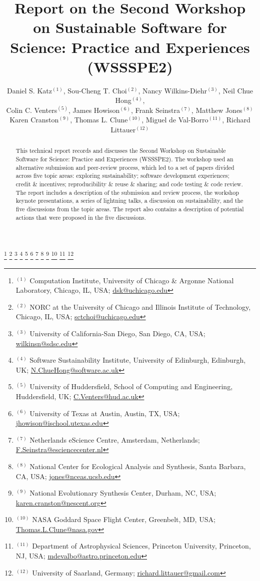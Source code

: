 \documentclass[11pt, oneside]{amsart}
\begin{document}
\title[]{Report on the Second Workshop on Sustainable Software for Science: Practice and Experiences (WSSSPE2)}

\author{Daniel S. Katz$^{(1)}$, Sou-Cheng T. Choi$^{(2)}$, Nancy Wilkins-Diehr$^{(3)}$, Neil Chue Hong$^{(4)}$,
\\Colin C. Venters$^{(5)}$, James Howison$^{(6)}$, Frank Seinstra$^{(7)}$, Matthew Jones$^{(8)}$
\\Karen Cranston$^{(9)}$, Thomas L. Clune$^{(10)}$, Miguel de Val-Borro$^{(11)}$, Richard Littauer$^{(12)}$}
%
\thanks{{}$^{(1)}$ Computation Institute, 
University of Chicago \& Argonne National Laboratory, Chicago, IL, USA; \url{dsk@uchicago.edu}}
%
\thanks{{}$^{(2)}$ NORC at the University of Chicago and Illinois Institute of Technology, Chicago, IL, USA; \url{sctchoi@uchicago.edu}}
%
\thanks{{}$^{(3)}$ University of California-San Diego, San Diego, CA, USA; \url{wilkinsn@sdsc.edu}}
%
\thanks{{}$^{(4)}$ Software Sustainability Institute, 
University of Edinburgh, Edinburgh, UK; \url{N.ChueHong@software.ac.uk}}
%
\thanks{{}$^{(5)}$ University of Huddersfield, School of Computing and Engineering, Huddersfield, UK; \url{C.Venters@hud.ac.uk}}
%
\thanks{{}$^{(6)}$ University of Texas at Austin, Austin, TX, USA; \url{jhowison@ischool.utexas.edu}}
%
\thanks{{}$^{(7)}$ Netherlands eScience Centre, Amsterdam, Netherlands; \url{F.Seinstra@esciencecenter.nl}}
%
\thanks{{}$^{(8)}$ National Center for Ecological Analysis and Synthesis, Santa Barbara, CA, USA; \url{jones@nceas.ucsb.edu}}
%
\thanks{{}$^{(9)}$ National Evolutionary Synthesis Center, Durham, NC, USA; \url{karen.cranston@nescent.org}}
%
\thanks{{}$^{(10)}$ NASA Goddard Space Flight Center, Greenbelt, MD, USA; \url{Thomas.L.Clune@nasa.gov}}
%
\thanks{{}$^{(11)}$ Department of Astrophysical Sciences, 
Princeton University, Princeton, NJ, USA; \url{mdevalbo@astro.princeton.edu}}
%
\thanks{{}$^{(12)}$ University of Saarland, Germany; \url{richard.littauer@gmail.com}}
%
 

\begin{abstract}
This technical report records and discusses the Second Workshop on Sustainable
Software for Science: Practice and Experiences (WSSSPE2). The workshop used an
alternative submission and peer-review process, which led to a set of papers
divided across five topic areas: exploring sustainability; software development
experiences; credit \& incentives; reproducibility \& reuse \& sharing; and code
testing \& code review. The report includes a description of the submission and
review process, the workshop keynote presentations, a series of lightning talks,
a discussion on sustainability, and the five discussions from the topic areas.
The report also contains a description of potential actions that were proposed
in the five discussions.
\end{abstract}
\end{document}
